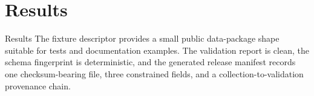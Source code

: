 \documentclass[
  ignorenonframetext,
]{beamer}
\author{\texorpdfstring{}{}}
\date{}
\begin{document}
\section{Results}\label{results}

\begin{frame}[allowframebreaks]{Results}
The fixture descriptor provides a small public data-package shape
suitable for tests and documentation examples. The validation report is
clean, the schema fingerprint is deterministic, and the generated
release manifest records one checksum-bearing file, three constrained
fields, and a collection-to-validation provenance chain.
\end{frame}
\end{document}
